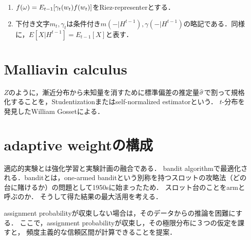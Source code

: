 \documentclass[uplatex,dvipdfmx]{jsreport}
\begin{document}
\begin{notation}\mbox{}
    \begin{enumerate}
        \item $f(\omega)=E_{t-1}[\gamma_t(w_t)f(w_t)]$をRiez-representerとする．
        \item 下付き文字$m_t,\gamma_t$は条件付き$m(-|H^{t-1}),\gamma(-|H^{t-1})$の略記である．同様に，$E[X|H^{t-1}]=E_{t-1}[X]$と表す．
    \end{enumerate}
\end{notation}

\section{Malliavin calculus}

\begin{tcolorbox}[colframe=ForestGreen, colback=ForestGreen!10!white,breakable,colbacktitle=ForestGreen!40!white,coltitle=black,fonttitle=\bfseries\sffamily,
title=]
    $Z$のように，漸近分布から未知量を消すために標準偏差の推定量$\widehat{\sigma}$で割って規格化することを，Studentizationまたはself-normalized estimatorという．
    $t$-分布を発見したWilliam Gossetによる．
\end{tcolorbox}

\section{adaptive weightの構成}

\begin{tcolorbox}[colframe=ForestGreen, colback=ForestGreen!10!white,breakable,colbacktitle=ForestGreen!40!white,coltitle=black,fonttitle=\bfseries\sffamily,
title=]
    適応的実験とは強化学習と実験計画の融合である．
    bandit algorithmで最適化される．banditとは，one-armed banditという別称を持つスロットの攻略法（どの台に賭けるか）の問題として1950sに始まったため．
    スロット台のことをarmと呼ぶのか．
    そうして得た結果の最大活用を考える．

    assignment probabilityが収束しない場合は，そのデータからの推論を困難にする．
    ここで，assignment probabilityが収束し，その極限分布に３つの仮定を課すと，
    頻度主義的な信頼区間が計算できることを提案\cite{Policy Evaluation}．
\end{tcolorbox}
\end{document}
